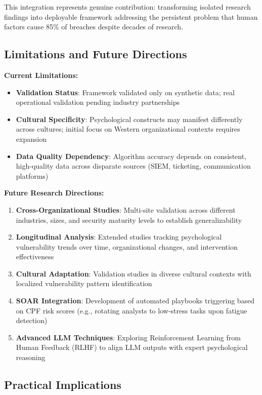 \documentclass[11pt, a4paper]{article}
\begin{document}
This integration represents genuine contribution: transforming isolated research findings into deployable framework addressing the persistent problem that human factors cause 85\% of breaches despite decades of research.

\subsection{Limitations and Future Directions}

\textbf{Current Limitations:}
\begin{itemize}
\item \textbf{Validation Status}: Framework validated only on synthetic data; real operational validation pending industry partnerships
\item \textbf{Cultural Specificity}: Psychological constructs may manifest differently across cultures; initial focus on Western organizational contexts requires expansion
\item \textbf{Data Quality Dependency}: Algorithm accuracy depends on consistent, high-quality data across disparate sources (SIEM, ticketing, communication platforms)
\end{itemize}

\textbf{Future Research Directions:}
\begin{enumerate}
\item \textbf{Cross-Organizational Studies}: Multi-site validation across different industries, sizes, and security maturity levels to establish generalizability
\item \textbf{Longitudinal Analysis}: Extended studies tracking psychological vulnerability trends over time, organizational changes, and intervention effectiveness
\item \textbf{Cultural Adaptation}: Validation studies in diverse cultural contexts with localized vulnerability pattern identification
\item \textbf{SOAR Integration}: Development of automated playbooks triggering based on CPF risk scores (e.g., rotating analysts to low-stress tasks upon fatigue detection)
\item \textbf{Advanced LLM Techniques}: Exploring Reinforcement Learning from Human Feedback (RLHF) to align LLM outputs with expert psychological reasoning
\end{enumerate}

\subsection{Practical Implications}
\end{document}
